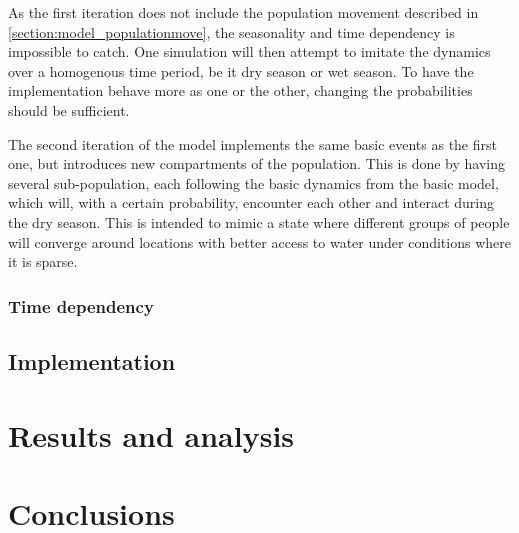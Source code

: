 \documentclass[10pt,a4paper]{article}
\begin{document}
As the first iteration does not include the population movement described in \cref{section:model_populationmove}, the seasonality and time dependency is impossible to catch. One simulation will then attempt to imitate the dynamics over a homogenous time period, be it dry season or wet season. To have the implementation behave more as one or the other, changing the probabilities should be sufficient.

The second iteration of the model implements the same basic events as the first one, but introduces new compartments of the population. This is done by having several sub-population, each following the basic dynamics from the basic model, which will, with a certain probability, encounter each other and interact during the dry season. This is intended to mimic a state where different groups of people will converge around locations with better access to water under conditions where it is sparse.

\subsubsection{Time dependency}

\subsection{Implementation}

\section{Results and analysis}

\section{Conclusions}



\end{document}
